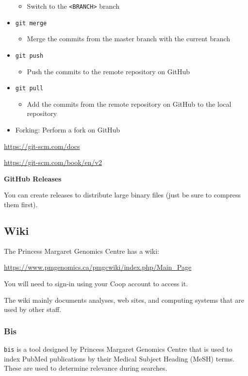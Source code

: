 \documentclass{article}
\begin{document}
\begin{itemize}
\begin{itemize}
\item Switch to the \texttt{<BRANCH>} branch
\end{itemize}
\item \texttt{git merge}
\begin{itemize}
\item Merge the commits from the master branch with the current branch
\end{itemize}
\item \texttt{git push}
\begin{itemize}
\item Push the commits to the remote repository on GitHub
\end{itemize}
\item \texttt{git pull}
\begin{itemize}
\item Add the commits from the remote repository on GitHub to the local repository
\end{itemize}
\item Forking: Perform a fork on GitHub
\end{itemize}

\url{https://git-scm.com/docs}

\url{https://git-scm.com/book/en/v2}

\textbf{GitHub Releases}

You can create releases to distribute large binary files (just be sure to compress them first).

\subsection{Wiki}

The Princess Margaret Genomics Centre has a wiki:

\url{https://www.pmgenomics.ca/pmgcwiki/index.php/Main_Page}

You will need to sign-in using your Coop account to access it.

The wiki mainly documents analyses, web sites, and computing systems
that are used by other staff.

\subsubsection{Bis}

\texttt{bis} is a tool designed by Princess Margaret Genomics Centre
that is used to index PubMed publications by their Medical Subject Heading (MeSH) terms. These are used to determine relevance during searches.
\end{document}
